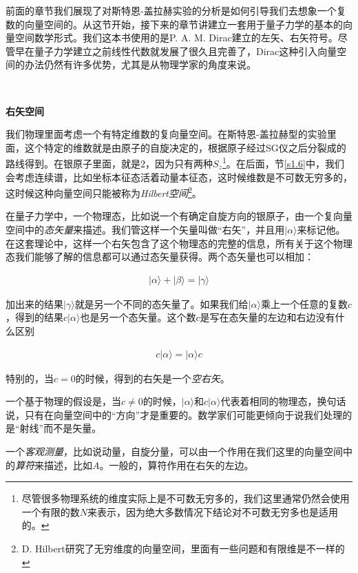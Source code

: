 \documentclass[UTF8,twoside]{ctexart}
\begin{document}
\noindent 前面的章节我们展现了对斯特恩-盖拉赫实验的分析是如何引导我们去想象一个复数的向量空间的。从这节开始，接下来的章节讲建立一套用于量子力学的基本的向量空间数学形式。我们这本书使用的是P. A. M. Dirac建立的左矢、右矢符号。尽管早在量子力学建立之前线性代数就发展了很久且完善了，Dirac这种引入向量空间的办法仍然有许多优势，尤其是从物理学家的角度来说。

\ 

\noindent \textbf{右矢空间}

\noindent 我们物理里面考虑一个有特定维数的复向量空间。在斯特恩-盖拉赫型的实验里面，这个特定的维数就是由原子的自旋决定的，根据原子经过SG仪之后分裂成的路线得到。在银原子里面，就是$2$，因为只有两种$S_z$\footnote{尽管很多物理系统的维度实际上是不可数无穷多的，我们这里通常仍然会使用一个有限的数$N$来表示，因为绝大多数情况下结论对不可数无穷多也是适用的。}。在后面，节\ref{s1.6}中，我们会考虑连续谱，比如坐标本征态活着动量本征态，这时候维数是不可数无穷多的，这时候这种向量空间只能被称为\emph{Hilbert空间}\footnote{D. Hilbert研究了无穷维度的向量空间，里面有一些问题和有限维是不一样的}。

在量子力学中，一个物理态，比如说一个有确定自旋方向的银原子，由一个复向量空间中的{\emph{态矢量}}来描述。我们管这样一个矢量叫做“右矢”，并且用$|\alpha\rangle$来标记他。在这套理论中，这样一个右矢包含了这个物理态的完整的信息，所有关于这个物理态我们能够了解的信息都可以通过态矢量获得。两个态矢量也可以相加：

\begin{align}
|\alpha\rangle + |\beta\rangle = |\gamma\rangle
\end{align}

\noindent 加出来的结果$|\gamma\rangle$就是另一个不同的态矢量了。如果我们给$|\alpha\rangle$乘上一个任意的复数$c$，得到的结果$c|\alpha\rangle$也是另一个态矢量。这个数$c$是写在态矢量的左边和右边没有什么区别

\begin{align}
c|\alpha\rangle = |\alpha\rangle c
\end{align}

\noindent 特别的，当$c=0$的时候，得到的右矢是一个{\emph{空右矢}}。

一个基于物理的假设是，当$c\neq 0$的时候，$|\alpha\rangle$和$c|\alpha\rangle$代表着相同的物理态，换句话说，只有在向量空间中的“方向”才是重要的。数学家们可能更倾向于说我们处理的是“射线”而不是矢量。

一个{\emph{客观测量}}，比如说动量，自旋分量，可以由一个作用在我们这里的向量空间中的{\emph{算符}}来描述，比如$A$。一般的，算符作用在右矢的左边。
\end{document}
